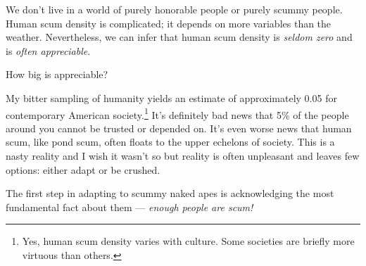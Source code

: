 We don't live in a world of purely honorable people or purely scummy
people. Human scum density is complicated; it depends on more variables
than the weather. Nevertheless, we can infer that human scum density is
\emph{seldom zero} and is \emph{often appreciable}.

How big is appreciable?

My bitter sampling of humanity yields an estimate of approximately 0.05
for contemporary American
society.\footnote{Yes, human scum density varies with culture. Some societies are
  briefly more virtuous than others.
} It's definitely bad
news that 5\% of the people around you cannot be trusted or depended on.
It's even worse news that human scum, like pond scum, often floats to
the upper echelons of society. This is a nasty reality and I wish it
wasn't so but reality is often unpleasant and leaves few options: either
adapt or be crushed.

The first step in adapting to scummy naked apes is acknowledging the
most fundamental fact about them --- \emph{enough people are scum!}


%


